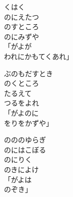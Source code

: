 \documentclass[10pt,b5j]{tarticle} %
\begin{document}
\vspace{1.5em} %
\newcommand{\linespace}{0.5em} %
\newcommand{\blocksize}{0.5\hsize} %
\begin{enumerate} %
    \begin{minipage}[c]{\blocksize}
    
        \vspace{\linespace}
        \item
        くはく\\
        のにえたつ\\
        のすところ\\
        のにみずや\\
        「がよが\\
        われにかもてくあれ」
        
        \vspace{\linespace}
        \item
        ぶのもだすとき\\
        のくところ\\
        たるえて\\
        つるをよれ\\
        「がよのに\\
        をりをかずや」
        
        \vspace{\linespace}
        \item
        のののゆらぎ\\
        のにはこぼる\\
        のにりく\\
        のきによけ\\
        「がよは\\
        のぞき」
        

\end{minipage}
\end{enumerate}
\end{document}
